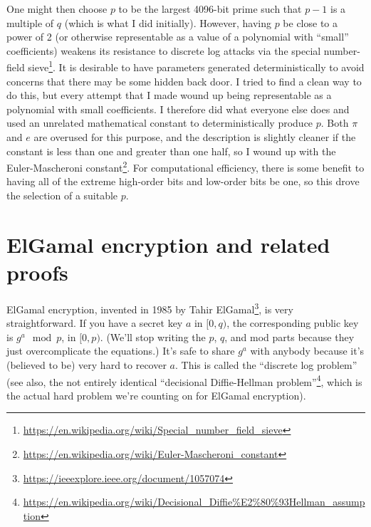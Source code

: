 One might then choose $p$ to be the largest 4096-bit prime such that
$p-1$ is a multiple of $q$ (which is what I did initially).  However,
having $p$ be close to a power of 2 (or otherwise representable as a
value of a polynomial with ``small'' coefficients) weakens its
resistance to discrete log attacks via the special number-field
sieve\footnote{\url{https://en.wikipedia.org/wiki/Special_number_field_sieve}}.
It is desirable to have parameters generated deterministically to
avoid concerns that there may be some hidden back door.  I tried to
find a clean way to do this, but every attempt that I made wound up
being representable as a polynomial with small coefficients.  I
therefore did what everyone else does and used an unrelated
mathematical constant to deterministically produce $p$.  Both $\pi$
and $e$ are overused for this purpose, and the description is slightly cleaner
if the constant is less than one and greater than one half, so I wound
up with the Euler-Mascheroni
constant\footnote{\url{https://en.wikipedia.org/wiki/Euler-Mascheroni_constant}}.
For computational efficiency,
there is some benefit to having all of the extreme high-order bits and
low-order bits be one, so this drove the selection of a suitable $p$.


\section{ElGamal encryption and related proofs}
ElGamal encryption, invented in 1985 by Tahir
ElGamal\footnote{\url{https://ieeexplore.ieee.org/document/1057074}}, is very straightforward. If
you have a secret key $a$ in $[0,q)$, the corresponding public key is
$g^a \mod p$, in $[0,p)$. (We'll stop writing the $p$, $q$, and mod
parts because they just overcomplicate the equations.) It's safe to
share $g^a$ with anybody because it's (believed to be) very hard to recover
$a$. This is called the ``discrete log problem'' (see also, the
not entirely identical ``decisional Diffie-Hellman
problem''\footnote{\url{https://en.wikipedia.org/wiki/Decisional_Diffie\%E2\%80\%93Hellman_assumption}},
which is the actual hard problem we're counting on for ElGamal
encryption).

